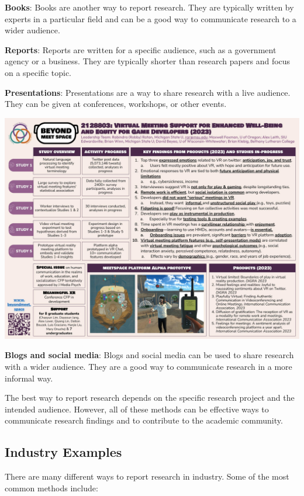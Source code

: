 \documentclass[
  b5paper]{book}
\begin{document}
\textbf{Books}: Books are another way to report research. They are typically written by experts in a particular field and can be a good way to communicate research to a wider audience.

\textbf{Reports}: Reports are written for a specific audience, such as a government agency or a business. They are typically shorter than research papers and focus on a specific topic.

\textbf{Presentations}: Presentations are a way to share research with a live audience. They can be given at conferences, workshops, or other events.

\includegraphics[width=1\textwidth,height=\textheight]{images/BMS 2023 poster final.jpg}

\textbf{Blogs and social media}: Blogs and social media can be used to share research with a wider audience. They are a good way to communicate research in a more informal way.

The best way to report research depends on the specific research project and the intended audience. However, all of these methods can be effective ways to communicate research findings and to contribute to the academic community.

\hypertarget{industry-examples}{%
\subsection*{Industry Examples}\label{industry-examples}}

There are many different ways to report research in industry. Some of the most common methods include:
\end{document}
